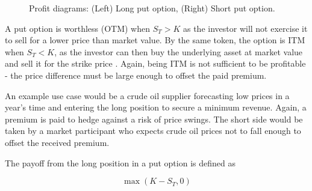 \documentclass[english,12pt,a4paper,pdftex,sci,utf8]{aaltothesis}
\begin{document}
\begin{figure}[H]
{

    
}
\caption{Profit diagrams: (Left) Long put option, (Right) Short put option.}
\label{fig:put_payoff}
\end{figure}

A put option is worthless (OTM) when $S_T > K$ as the investor will not exercise it to sell for a lower price than market value. By the same token, the option is ITM when  $S_T < K$, as the investor can then buy the underlying asset at market value and sell it for the strike price \cite[p. 209]{hull2013fundamentals}. Again, being ITM is not sufficient to be profitable - the price difference must be large enough to offset the paid premium.

An example use case would be a crude oil supplier forecasting low prices in a year's time and entering the long position to secure a minimum revenue. Again, a premium is paid to hedge against a risk of price swings. The short side would be taken by a market participant who expects crude oil prices not to fall enough to offset the received premium.
\bigskip

The payoff from the long position in a put option is defined as

\begin{equation*}
    \max(K-S_T,0)
\end{equation*}
\end{document}

